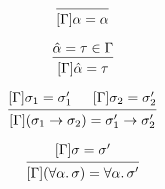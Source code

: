 \documentclass[12pt]{article}
\begin{document}
\pagestyle{empty}

\[
    \begin{prooftree}
        \infer0{[\Gamma]\alpha = \alpha}
    \end{prooftree}
\]

\[
    \begin{prooftree}
        \hypo{\hat{\alpha} = \tau \in \Gamma}
        \infer1{[\Gamma]\hat{\alpha} = \tau}
    \end{prooftree}
\]

\[
    \begin{prooftree}
        \hypo{[\Gamma]\sigma_1 = \sigma_1'}
        \hypo{[\Gamma]\sigma_2 = \sigma_2'}
        \infer2{[\Gamma](\sigma_1 \to \sigma_2) = \sigma_1' \to \sigma_2'}
    \end{prooftree}
\]

\[
    \begin{prooftree}
        \hypo{[\Gamma]\sigma = \sigma'}
        \infer1{[\Gamma](\forall \alpha\ldotp \sigma) = \forall \alpha\ldotp \sigma'}
    \end{prooftree}
\]
\end{document}
